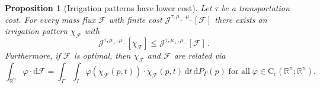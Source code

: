 \documentclass[10pt,a4paper,oneside,final]{article}
\newcommand{\R}{{\mathbb{R}}}
\newcommand{\de}{{\mathrm{d}}}
\newcommand{\cont}{{\mathrm{C}}}
\newcommand{\flux}{{\mathcal{F}}}
\newcommand{\reSpace}{\Gamma}
\newcommand{\reMeasure}{P_{\reSpace}}
\newcommand{\JEn}{{\mathcal{J}}}
\newcommand{\transportPath}{mass flux}
\numberwithin{equation}{section}
\theoremstyle{plain}
\newtheorem{proposition}[theorem]{Proposition}
\theoremstyle{definition}
\theoremstyle{remark}
\begin{document}
\begin{proposition}[Irrigation patterns have lower cost]\label{prop:constructPatternFromFlux}
Let $\tau$ be a transportation cost.
For every \transportPath{} $\flux$ with finite cost $\JEn^{\tau,\mu_+,\mu_-}[\flux]$ there exists an irrigation pattern $\chi_\flux$ with
\begin{equation}\label{eq:urban_chi_leq_urban_flux}
\JEn^{\tau,\mu_+,\mu_-}[\chi_\flux] \leq \JEn^{\tau,\mu_+,\mu_-}[\flux]\,.
\end{equation}
Furthermore, if $\flux$ is optimal, then $\chi_\flux$ and $\flux$ are related via
\begin{equation}\label{eq:constructPatternFromFlux}
\int_{\R^n}\varphi\cdot\de\flux=\int_\reSpace\int_I\varphi(\chi_\flux(p,t))\cdot\dot\chi_\flux(p,t)\,\de t\,\de \reMeasure(p) \;\text{for all}\; \varphi\in \cont_c(\R^n;\R^n).
\end{equation}
\end{proposition}
\end{document}

